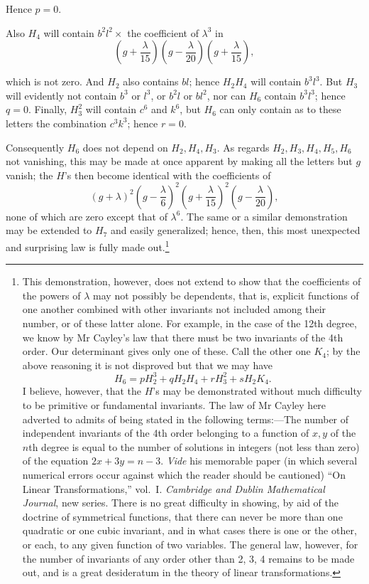 \documentclass[11pt]{article}
\newcommand{\sourcepage}[1]{\marginpar{\scriptsize p.~#1}}
\begin{document}
{{Hence $p=0$.

Also $H_4$ will contain $b^2l^2\times$ the coefficient of $\lambda^3$ in
\[
\left(g+\frac{\lambda}{15}\right)\left(g-\frac{\lambda}{20}\right)\left(g+\frac{\lambda}{15}\right),
\]

\sourcepage{279}
which is not zero. And $H_2$ also contains $bl$; hence $H_2H_4$ will contain $b^3l^3$. But $H_3$ will evidently not contain $b^3$ or $l^3$, or $b^2l$ or $bl^2$, nor can $H_6$ contain $b^3l^3$; hence $q=0$. Finally, $H_3^2$ will contain $c^6$ and $k^6$, but $H_6$ can only contain as to these letters the combination $c^3k^3$; hence $r=0$.

Consequently $H_6$ does not depend on $H_2,H_4,H_3$. As regards $H_2,H_3,H_4,H_5,H_6$ not vanishing, this may be made at once apparent by making all the letters but $g$ vanish; the $H$'s then become identical with the coefficients of
\[
(g+\lambda)^2\left(g-\frac{\lambda}{6}\right)^2
\left(g+\frac{\lambda}{15}\right)^2\left(g-\frac{\lambda}{20}\right),
\]
none of which are zero except that of $\lambda^6$. The same or a similar demonstration may be extended to $H_7$ and easily generalized; hence, then, this most unexpected and surprising law is fully made out.\footnote{This demonstration, however, does not extend to show that the coefficients of the powers of $\lambda$ may not possibly be dependents, that is, explicit functions of one another combined with other invariants not included among their number, or of these latter alone. For example, in the case of the 12th degree, we know by Mr Cayley's law that there must be two invariants of the 4th order. Our determinant gives only one of these. Call the other one $K_4$; by the above reasoning it is not disproved but that we may have
\[
H_6=pH_2^3+qH_2H_4+rH_3^2+sH_2K_4.
\]
I believe, however, that the $H$'s may be demonstrated without much difficulty to be primitive or fundamental invariants. The law of Mr Cayley here adverted to admits of being stated in the following terms:---The number of independent invariants of the 4th order belonging to a function of $x,y$ of the $n$th degree is equal to the number of solutions in integers (not less than zero) of the equation $2x+3y=n-3$. \emph{Vide} his memorable paper (in which several numerical errors occur against which the reader should be cautioned) ``On Linear Transformations,'' vol.~I. \emph{Cambridge and Dublin Mathematical Journal}, new series. There is no great difficulty in showing, by aid of the doctrine of symmetrical functions, that there can never be more than one quadratic or one cubic invariant, and in what cases there is one or the other, or each, to any given function of two variables. The general law, however, for the number of invariants of any order other than 2, 3, 4 remains to be made out, and is a great desideratum in the theory of linear transformations.}

}}
\end{document}
